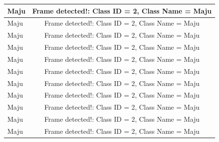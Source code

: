 \begin{longtable}{|l|c|}
  Maju           & Frame detected!: Class ID = 2, Class Name = Maju   \\ \hline
  Maju           & Frame detected!: Class ID = 2, Class Name = Maju   \\ \hline
  Maju           & Frame detected!: Class ID = 2, Class Name = Maju   \\ \hline
  Maju           & Frame detected!: Class ID = 2, Class Name = Maju \\ \hline
  Maju           & Frame detected!: Class ID = 2, Class Name = Maju   \\ \hline
  Maju           & Frame detected!: Class ID = 2, Class Name = Maju   \\ \hline
  Maju           & Frame detected!: Class ID = 2, Class Name = Maju   \\ \hline
  Maju           & Frame detected!: Class ID = 2, Class Name = Maju   \\ \hline
  Maju           & Frame detected!: Class ID = 2, Class Name = Maju   \\ \hline
  Maju           & Frame detected!: Class ID = 2, Class Name = Maju   \\ \hline
  Maju           & Frame detected!: Class ID = 2, Class Name = Maju   \\ \hline
\end{longtable}

